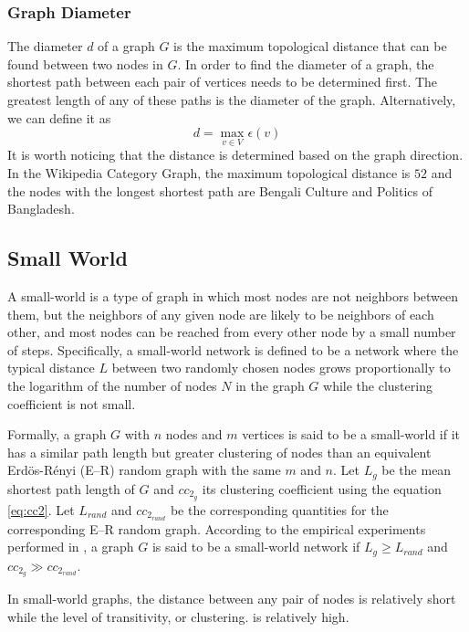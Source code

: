 \subsubsection{\hspace*{3pt} Graph Diameter}

The diameter $d$ of a graph $G$ is the maximum topological distance that can be found between two nodes in $G$. In order to find the diameter of a graph, the shortest path between each pair of vertices needs to be determined first. The greatest length of any of these paths is the diameter of the graph. Alternatively, we can define it as 
\begin{equation}
d=\max _{v\in V}\epsilon (v)
\end{equation}
It is worth noticing that the distance is determined based on the graph direction. In the Wikipedia Category Graph, the maximum topological distance is $52$ and the nodes with the longest shortest path are Bengali Culture and Politics of Bangladesh. 


\subsection{\hspace*{3pt} Small World}

A small-world is a type of graph in which most nodes are not neighbors between them, but the neighbors of any given node are likely to be neighbors of each other, and most nodes can be reached from every other node by a small number of steps. Specifically, a small-world network is defined to be a network where the typical distance $L$ between two randomly chosen nodes grows proportionally to the logarithm of the number of nodes $N$ in the graph $G$ while the clustering coefficient is not small.

Formally, a graph $G$ with $n$ nodes and $m$ vertices is said to be a small-world if it has a similar path length but greater clustering of nodes than an equivalent Erdös-Rényi (E–R) random graph with the same $m$ and $n$. Let $L_g$ be the mean shortest path length of $G$ and $cc_{2_g}$ its clustering coefficient using the equation \ref{eq:cc2}. Let $L_{rand}$ and  $cc_{2_{rand}}$ be the corresponding quantities for the corresponding E–R random graph. According to the empirical experiments performed in \cite{watts1998collective}, a graph $G$ is said to be a small-world network if $L_g \ge L_{rand}$ and $ cc_{2_g} \gg cc_{2_{rand}}$.

In small-world graphs, the distance between any pair of nodes is relatively short while the level of transitivity, or clustering. is relatively high.



